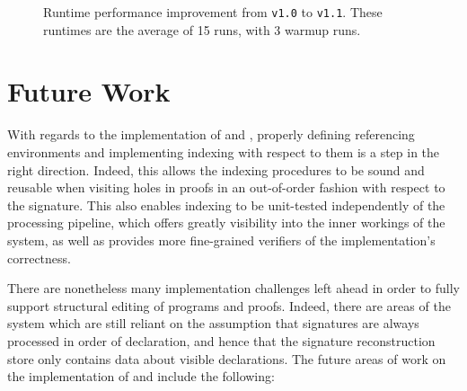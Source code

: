\clearpage
\begin{figure}[H]
\centering
{}
\caption[Runtime performance improvement from \Beluga \texttt{v1.0} to \texttt{v1.1}]{%
Runtime performance improvement from \Beluga \texttt{v1.0} to \texttt{v1.1}.
These runtimes are the average of 15 runs, with 3 warmup runs.
}
\label{figure:runtime-improvement}
\end{figure}

\section{Future Work}

With regards to the implementation of \Beluga and \Harpoon, properly defining referencing environments and implementing indexing with respect to them is a step in the right direction.
Indeed, this allows the indexing procedures to be sound and reusable when visiting holes in \Harpoon proofs in an out-of-order fashion with respect to the \Beluga signature.
This also enables indexing to be unit-tested independently of the processing pipeline, which offers greatly visibility into the inner workings of the system, as well as provides more fine-grained verifiers of the implementation's correctness.

There are nonetheless many implementation challenges left ahead in order to fully support structural editing of \Beluga programs and \Harpoon proofs.
Indeed, there are areas of the system which are still reliant on the assumption that signatures are always processed in order of declaration, and hence that the signature reconstruction store only contains data about visible declarations.
The future areas of work on the implementation of \Beluga and \Harpoon include the following:

